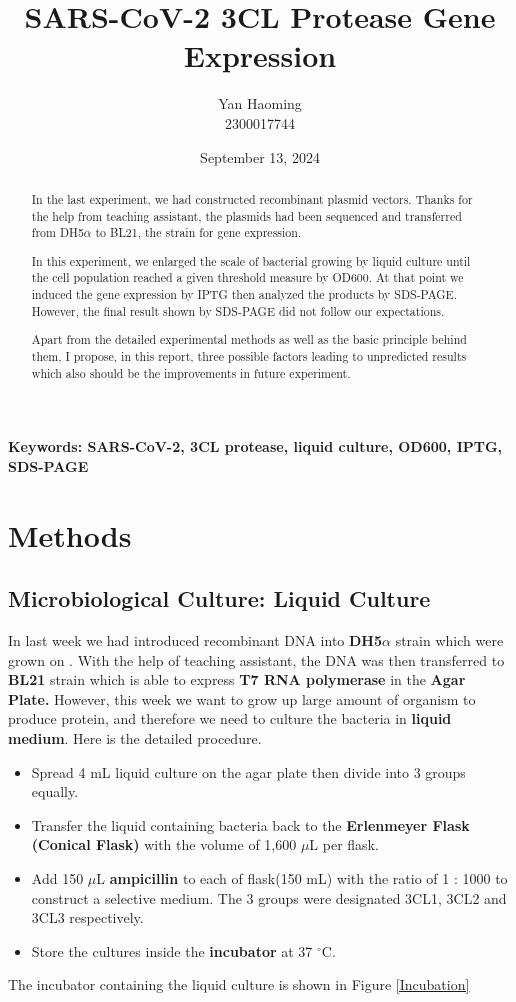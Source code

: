 \documentclass{article}
\title{SARS-CoV-2 3CL Protease Gene Expression}
\author{Yan Haoming\\2300017744}
\date{September 13, 2024}
\begin{document}
\maketitle
\begin{abstract}
    In the last experiment, we had constructed recombinant plasmid vectors.
    Thanks for the help from teaching assistant, the plasmids had been sequenced and transferred from DH5$\alpha$ to BL21, the strain for gene expression.

    In this experiment, we enlarged the scale of bacterial growing by liquid culture until the cell population reached a given threshold measure by OD600.
    At that point we induced the gene expression by IPTG then analyzed the products by SDS-PAGE.
    However, the final result shown by SDS-PAGE did not follow our expectations.

    Apart from the detailed experimental methods as well as the basic principle behind them, I propose, in this report, three possible factors leading to unpredicted results which also should be the improvements in future experiment.
\end{abstract}
\textbf{Keywords: SARS-CoV-2, 3CL protease, liquid culture, OD600, IPTG, SDS-PAGE}
\section{Methods}
\subsection{Microbiological Culture: Liquid Culture}
In last week we had introduced recombinant DNA into \textbf{DH5$\alpha$} strain which were grown on .
With the help of teaching assistant, the DNA was then transferred to \textbf{BL21} strain which is able to express \textbf{T7 RNA polymerase} in the \textbf{Agar Plate.}
However, this week we want to grow up large amount of organism to produce protein, 
and therefore we need to culture the bacteria in \textbf{liquid medium}. Here is the detailed procedure.
\begin{itemize}
    \item Spread 4 mL liquid culture on the agar plate then divide into 3 groups equally.
    \item Transfer the liquid containing bacteria back to the \textbf{Erlenmeyer Flask (Conical Flask)} with the volume of 1,600 $\mu$L per flask.
    \item Add 150 $\mu$L \textbf{ampicillin} to each of flask(150 mL) with the ratio of 1 : 1000 to construct a selective medium. 
    The 3 groups were designated 3CL1, 3CL2 and 3CL3 respectively.
    \item Store the cultures inside the \textbf{incubator} at 37 $^\circ$C.
\end{itemize} 
The incubator containing the liquid culture is shown in Figure \ref{Incubation}
\end{document}
